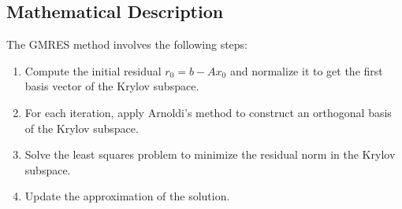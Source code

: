 \documentclass{article}
\begin{document}
\subsection{Mathematical Description}
The GMRES method involves the following steps:
\begin{enumerate}
    \item Compute the initial residual $r_0 = b - Ax_0$ and normalize it to get the first basis vector of the Krylov subspace.
    \item For each iteration, apply Arnoldi's method to construct an orthogonal basis of the Krylov subspace.
    \item Solve the least squares problem to minimize the residual norm in the Krylov subspace.
    \item Update the approximation of the solution.
\end{enumerate}
\end{document}
